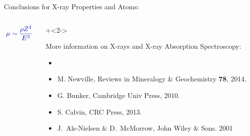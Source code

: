 \begin{slide}{ Conclusions for X-ray Properties and Atoms: }
\begin{columns}[T]
\begin{column}{35mm}
{    \Large \[ {\Blue{ \mu \sim \frac{\rho Z^4}{ E^3} }} \]

  }

  \vmm\vmm\vfill
  \end{column}
  \begin{column}{95mm}
\onslide+<2->{
  \small{
       More information on X-rays and X-ray Absorption Spectroscopy:

  \begin{itemize}
  \item[] {}
  \item[] {} M. Newville, Reviews in  Mineralogy \& Geochemistry {\bf{78}}, 2014.
  \item[] {} G. Bunker, Cambridge Univ  Press,  2010.
  \item[] {} S. Calvin, CRC Press, 2013.
  \item[]  {}  J.~Als-Nielsen
    \& D.~McMorrow,  John Wiley \& Sons. 2001
    
  \end{itemize}
}
}
  \end{column}
  \end{columns}
  

 \vfill
\end{slide}
 




